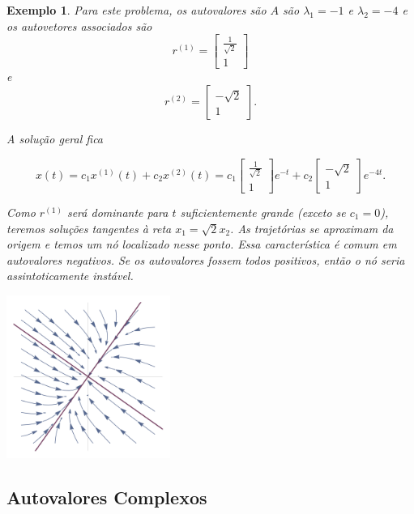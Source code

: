 \documentclass[a4paper,portuguese,9pt,final]{extarticle}
\newtheorem{example}{Exemplo}[section]
\begin{document}
\begin{multicols*}{2}
\begin{example}
                    Para este problema, os autovalores são $A$ são $\lambda_1 = -1$ e $\lambda_2 = -4$ e os autovetores associados são 
                $$r^{(1)} = \begin{bmatrix} \frac{1}{\sqrt{2}}\\ 1 \end{bmatrix}$$ e  $$r^{(2)} = \begin{bmatrix} -\sqrt{2}\\ 1 \end{bmatrix}.$$
                
                    A solução geral fica
                    
                    \begin{equation*}
                        x(t) = c_1 x^{(1)}(t) + c_2 x^{(2)}(t) = c_1 \begin{bmatrix} \frac{1}{\sqrt{2}}\\ 1 \end{bmatrix}e^{-t} + c_2 \begin{bmatrix} -\sqrt{2}\\ 1\end{bmatrix}e^{-4t}.
                    \end{equation*}
                    
                    Como $r^{(1)}$ será dominante para $t$ suficientemente grande (exceto se $c_1=0$), teremos soluções tangentes à reta $x_1=\sqrt{2}x_2$. As trajetórias se aproximam da origem e temos um nó localizado nesse ponto. Essa característica é comum em autovalores negativos. Se os autovalores fossem todos positivos, então o nó seria assintoticamente instável. 
                    
                    \includegraphics[width=0.4\textwidth]{fase_2}
                
                \end{example}
                
        \subsection{Autovalores Complexos}
        

\end{multicols*}
\end{document}
